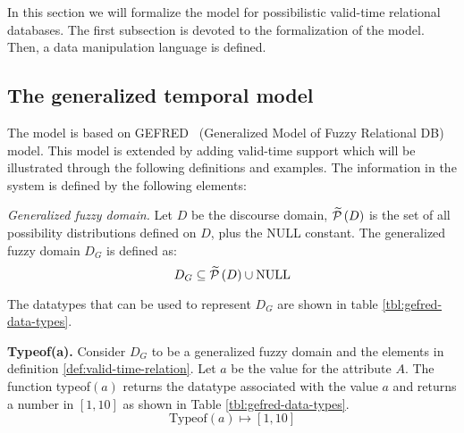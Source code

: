 %
%

In this section we will formalize the model for possibilistic valid-time relational databases. The first subsection is devoted to the formalization of the model. Then, a data manipulation language is defined.

\subsection{\label{subsec:temporal-model}The generalized temporal model}
The model is based on GEFRED~\cite{Medina1994} (Generalized Model of Fuzzy Relational DB) model. This model is extended by adding valid-time support which will be illustrated through the following definitions and examples. The information in the system is defined by the following elements:

\begin{definition}
\label{def:generalized-fuzzy-domain}
\emph{Generalized fuzzy domain.}
Let $D$ be the discourse domain, $\widetilde {\mathcal{P}}\left(D \right)$ is the set of all possibility distributions defined on $D$, plus the NULL constant. The generalized fuzzy domain $D_G$ is defined as:
\begin{equation}
\label{eq:generalized-fuzzy-domain}
D_G \subseteq \widetilde {\mathcal{P}}\left(D \right)\cup \text{NULL}
\end{equation}
\end{definition}
The datatypes that can be used to represent $D_G$ are shown in table \ref{tbl:gefred-data-types}. 

\begin{definition}
\label{def:typeof-domain}
\textbf{Typeof(a).}
Consider $D_G$ to be a generalized fuzzy domain and the elements in definition \ref{def:valid-time-relation}. Let $a$ be the value for the attribute $A$. The function typeof$\left(a \right)$ returns the datatype associated with the value $a$ and returns a number in $\left[1, 10 \right]$ as shown in Table \ref{tbl:gefred-data-types}.
\begin{equation}
 \label{eq:typeof}
\mbox{Typeof} \left(a \right) \mapsto \left[1, 10 \right]
\end{equation}

\end{definition}


